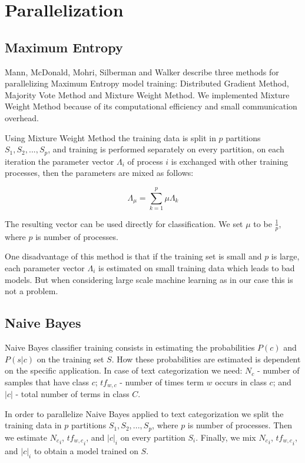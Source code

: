 \documentclass{report}
\begin{document}
\chapter{Parallelization}

\section{Maximum Entropy}

Mann, McDonald, Mohri, Silberman and Walker \cite{conf/nips/MannMMSW09} describe three methods for parallelizing Maximum Entropy model training: Distributed Gradient Method, Majority Vote Method and Mixture Weight Method. We implemented Mixture Weight Method because of its computational efficiency and small communication overhead.

Using Mixture Weight Method the training data is split in $p$ partitions $S_1, S_2, ..., S_p$, and training is performed separately on every partition, on each iteration the parameter vector $\Lambda_i$ of process $i$ is exchanged with other training processes, then the parameters are mixed as follows:

\[
\Lambda_{\mu} = \sum_{k=1}^{p} \mu \Lambda_{k}
\]

The resulting vector can be used directly for classification. We set $\mu$ to be $\frac{1}{p}$, where $p$ is number of processes. 

One disadvantage of this method is that if the training set is small and $p$ is large, each parameter vector $\Lambda_i$ is estimated on small training data which leads to bad models. But when considering large scale machine learning as in our case this is not a problem.

\section{Naive Bayes}

Naive Bayes classifier training consists in estimating the probabilities $P(c)$ and $P(s|c)$ on the training set $S$. How these probabilities are estimated  is dependent on the specific application. In case of text categorization we need: $N_c$ - number of samples that have class $c$; $tf_{w,c}$ - number of times term $w$ occurs in class $c$; and $|c|$ - total number of terms in class $C$.

In order to parallelize Naive Bayes applied to text categorization we split the training data in $p$ partitions $S_1, S_2, ..., S_p$, where $p$ is number of processes. Then we estimate ${N_c}_i$, ${tf_{w,c}}_i$, and ${|c|}_i$ on every partition $S_i$. Finally, we mix ${N_c}_i$, ${tf_{w,c}}_i$, and ${|c|}_i$ to obtain a model trained on $S$.
\end{document}

